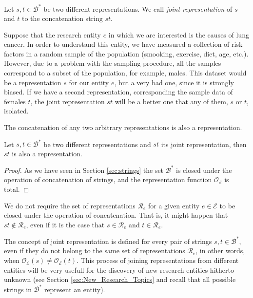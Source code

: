\begin{definition}
Let $s, t \in \mathcal{B}^\ast$ be two different representations. We call \emph{joint representation} of $s$ and $t$ to the concatenation string $st$.
\end{definition}

\begin{example}
\label{ex:lung_cancer}
Suppose that the research entity $e$ in which we are interested is the causes of lung cancer. In order to understand this entity, we have measured a collection of risk factors in a random sample of the population (smooking, exercise, diet, age, etc.). However, due to a problem with the sampling procedure, all the samples correspond to a subset of the population, for example, males. This dataset would be a representation $s$ for our entity $e$, but a very bad one, since it is strongly biased. If we have a second representation, corresponding the sample data of females $t$, the joint representation $st$ will be a better one that any of them, $s$ or $t$, isolated.
\end{example}

The concatenation of any two arbitrary representations is also a representation.

\begin{proposition}
Let $s, t \in \mathcal{B}^\ast$ be two different representations and $st$ its joint representation, then $st$ is also a representation.
\end{proposition}
\begin{proof}
As we have seen in Section \ref{sec:strings} the set $\mathcal{B}^\ast$ is closed under the operation of concatenation of strings, and the representation function $\mathcal{O}_\mathcal{E}$ is total.
\end{proof}

We do not require the set of representations $\mathcal{R}_e$ for a given entity $e \in \mathcal{E}$ to be closed under the operation of concatenation. That is, it might happen that $st \notin \mathcal{R}_e$, even if it is the case that $s \in \mathcal{R}_e$ and $t \in \mathcal{R}_e$.

The concept of joint representation is defined for every pair of strings $s, t \in \mathcal{B}^\ast$, even if they do not belong to the same set of representations $\mathcal{R}_e$, in other words, when $\mathcal{O}_\mathcal{E} \left( s \right) \neq \mathcal{O}_\mathcal{E} \left( t \right)$. This process of joining representations from different entities will be very usefull for the discovery of new research entities hitherto unknown (see Section \ref{sec:New_Research_Topics} and recall that all possible strings in $\mathcal{B}^\ast$ represent an entity).


